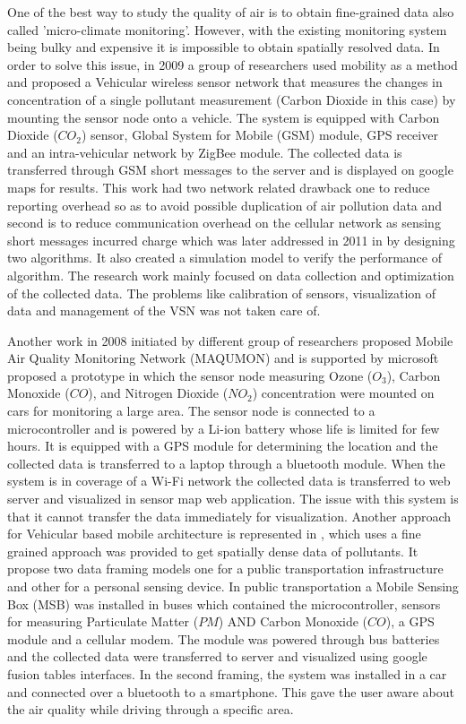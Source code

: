  One of the best way to study the quality of air is to obtain fine-grained data also called 'micro-climate monitoring'. However, with the existing monitoring system being bulky and expensive it is impossible to obtain spatially resolved data. In order to solve this issue, in 2009 a group of researchers used mobility as a method and proposed a Vehicular wireless sensor network \cite{Hu2009} that measures the changes in concentration of a single pollutant measurement (Carbon Dioxide in this case) by mounting the sensor node onto a vehicle. The system is equipped with Carbon Dioxide ($CO_2$) sensor, Global System for Mobile (GSM) module, GPS receiver and  an intra-vehicular network by ZigBee module. The collected data is transferred through GSM short messages to the server and is displayed on google maps for results. This work had two network related drawback one to reduce reporting overhead so as to avoid possible duplication of air pollution data and second is to reduce communication overhead on the cellular network as sensing short messages incurred charge which was later addressed in 2011 in \cite{Hu2011} by designing two algorithms. It also created a simulation model to verify the performance of algorithm. The research work mainly focused on data collection and optimization of the collected data. The problems like calibration of sensors, visualization of data and management of the VSN was not taken care of.

Another work in 2008 initiated by different group of researchers proposed Mobile Air Quality Monitoring Network (MAQUMON) \cite{Volgyesi2008} and is supported by microsoft proposed a prototype in which the sensor node  measuring Ozone ($O_3$), Carbon Monoxide ($CO$), and Nitrogen Dioxide ($NO_2$) concentration were mounted on cars for monitoring a large area. The sensor node is connected to a microcontroller and is powered by a Li-ion battery whose life is limited for few hours. It is equipped with a GPS module for determining the location and the collected data is transferred to a laptop through a bluetooth module. When the system is in coverage of a Wi-Fi network the collected data is transferred to web server and visualized in sensor map web application. The issue with this system is that it cannot transfer the data immediately for visualization. Another approach for Vehicular based mobile architecture is represented in \cite{Devarakonda2013}, which uses a fine grained approach was provided to get spatially dense data of pollutants. It propose two data framing models one for a public transportation infrastructure and other for a personal sensing device. In public transportation a Mobile Sensing Box (MSB) was installed in buses which contained the microcontroller, sensors for measuring Particulate Matter ($PM$) AND Carbon Monoxide ($CO$), a GPS module and a cellular modem. The module was powered through bus batteries and the collected data were transferred to server and visualized using google fusion tables interfaces. In the second framing, the system was installed in a car and connected over a bluetooth to a smartphone. This gave the user aware about the air quality while driving through a specific area.

